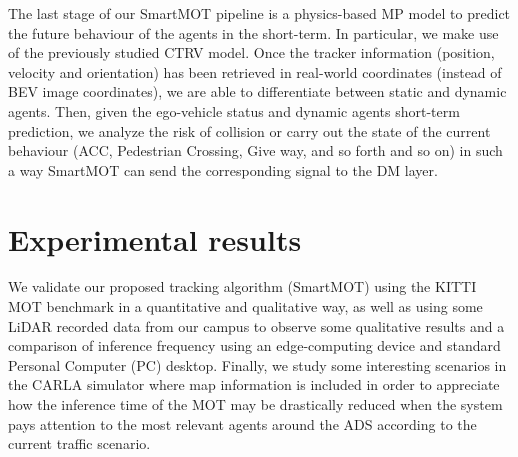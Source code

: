 The last stage of our SmartMOT pipeline is a physics-based \ac{MP} model to predict the future behaviour of the agents in the short-term. In particular, we make use of the previously studied \ac{CTRV} model. Once the tracker information (position, velocity and orientation) has been retrieved in real-world coordinates (instead of \ac{BEV} image coordinates), we are able to differentiate between static and dynamic agents. Then, given the ego-vehicle status and dynamic agents short-term prediction, we analyze the risk of collision or carry out the state of the current behaviour (\ac{ACC}, Pedestrian Crossing, Give way, and so forth and so on) in such a way SmartMOT can send the corresponding signal to the \ac{DM} layer. %
\begin{comment}
\begin{figure}[] 
	\centering
	\texttt{[image: chapter\_4\_SmartMOT/filtering\_process\_example.jpg]}
	\captionsetup{justification=justified}
	\caption[Simulation use case of SmartMOT in the \ac{CARLA} simulator]{Simulation use case of SmartMOT in the \ac{CARLA} simulator: Non-relevant objects are filtered by means of the monitored lanes-based attention module. Nevertheless, \acfp{VRU} are considered on the sidewalk if they are close enough to the closest segment of the corresponding monitored lane.}
	\label{fig:chapter_4_SmartMOT/filtering_process_example}
\end{figure} 
\end{comment}

\section{Experimental results}
\label{sec:4_mot}

We validate our proposed tracking algorithm (SmartMOT) using the KITTI \ac{MOT} benchmark \cite{geiger2012we} in a quantitative and qualitative way, as well as using some \ac{LiDAR} recorded data from our campus to observe some qualitative results and a comparison of inference frequency using an edge-computing device and standard Personal Computer (PC) desktop. Finally, we study some interesting scenarios in the \ac{CARLA} simulator where map information is included in order to appreciate how the inference time of the \ac{MOT} may be drastically reduced when the system pays attention to the most relevant agents around the \ac{ADS} according to the current traffic scenario. 

